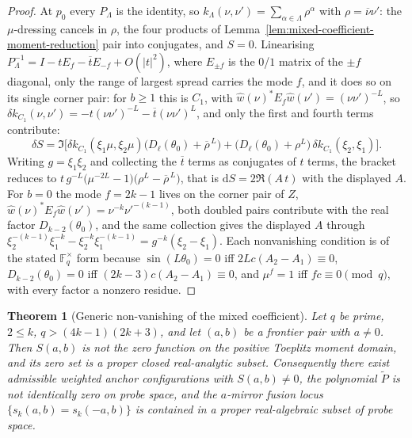 \documentclass[11pt]{article}
\newtheorem{theorem}{Theorem}
\begin{document}
\begin{proof}
At $p_0$ every $P_\Lambda$ is the identity, so $k_\Lambda(\nu,\nu')=\sum_{\alpha\in\Lambda}
\rho^{\alpha}$ with $\rho=\overline{\nu}\nu'$: the $\mu$-dressing cancels in $\rho$, the four
products of Lemma~\ref{lem:mixed-coefficient-moment-reduction} pair into conjugates, and $S=0$.
Linearising $P_\Lambda^{-1}=I-tE_f-\overline t E_{-f}+O(|t|^2)$, where $E_{\pm f}$ is the
$0$/$1$ matrix of the $\pm f$ diagonal, only the range of largest spread carries the mode $f$, and
it does so on its single corner pair: for $b\ge1$ this is $C_1$, with
$\widehat w(\nu)^\ast E_f\widehat w(\nu')=(\nu\nu')^{-L}$, so
$\delta k_{C_1}(\nu,\nu')=-t(\nu\nu')^{-L}-\overline t(\nu\nu')^{L}$, and only the first and fourth
terms contribute:
\[
\delta S
=
\Im\bigl[\delta k_{C_1}(\xi_1\mu,\xi_2\mu)\bigl(D_\ell(\theta_0)+\overline\rho^{\,L}\bigr)
+\bigl(D_\ell(\theta_0)+\rho^{L}\bigr)\,\delta k_{C_1}(\xi_2,\xi_1)\bigr].
\]
Writing $g=\xi_1\xi_2$ and collecting the $\overline t$ terms as conjugates of $t$ terms, the
bracket reduces to $t\,g^{-L}\bigl(\mu^{-2L}-1\bigr)\bigl(\rho^{L}-\overline\rho^{\,L}\bigr)$, that
is $\mathrm{d}S=2\Re(A\,t)$ with the displayed $A$.
For $b=0$ the mode $f=2k-1$ lives on the corner pair of $Z$,
$\widehat w(\nu)^\ast E_f\widehat w(\nu')=\nu^{-k}\nu'^{-(k-1)}$, both doubled pairs contribute
with the real factor $D_{k-2}(\theta_0)$, and the same collection gives the displayed $A$ through
$\xi_2^{-(k-1)}\xi_1^{-k}-\xi_2^{-k}\xi_1^{-(k-1)}=g^{-k}(\xi_2-\xi_1)$.
Each nonvanishing condition is of the stated $\mathbb{F}_q^{\times}$ form because
$\sin(L\theta_0)=0$ iff $2Lc(A_2-A_1)\equiv0$, $D_{k-2}(\theta_0)=0$ iff
$(2k-3)c(A_2-A_1)\equiv0$, and $\mu^{f}=1$ iff $fc\equiv0\pmod q$, with every factor a nonzero
residue.
\end{proof}

\begin{theorem}[Generic non-vanishing of the mixed coefficient]
\label{thm:generic-nonvanishing-mixed-coefficient}
Let $q$ be prime, $2\le k$, $q>(4k-1)(2k+3)$, and let $(a,b)$ be a frontier pair with $a\neq0$.
Then $S(a,b)$ is not the zero function on the positive Toeplitz moment domain, and its zero set is
a proper closed real-analytic subset.
Consequently there exist admissible weighted anchor configurations with $S(a,b)\neq0$, the
polynomial $\widetilde P$ is not identically zero on probe space, and the $a$-mirror fusion locus
$\{s_k(a,b)=s_k(-a,b)\}$ is contained in a proper real-algebraic subset of probe space.
\end{theorem}
\end{document}
